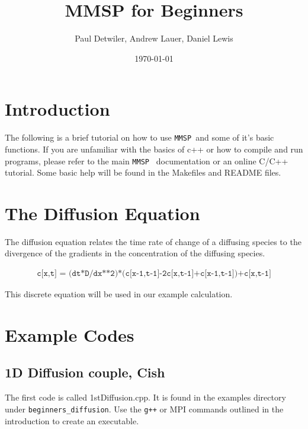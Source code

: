 \documentclass[10pt]{article}
\title{MMSP for Beginners}
\author{Paul Detwiler, Andrew Lauer, Daniel Lewis}
\date{\today}
\def\MMSP{{\tt MMSP\ }}
\begin{document}
\maketitle
\section{Introduction}
The following is a brief tutorial on how to use \MMSP and some of it's
basic functions. If you are unfamiliar with the basics of c++ or how
to compile and run programs, please refer to the main \MMSP
documentation or an online C/C++ tutorial.  Some basic help will be
found in the Makefiles and README files.

\section{The Diffusion Equation}

The diffusion equation relates the time rate of change of a diffusing
species to the divergence of the gradients in the concentration of the
diffusing species.

\begin{eqnarray}
\texttt{c[x,t] = (dt*D/dx**2)*(c[x-1,t-1]-2c[x,t-1]+c[x-1,t-1])+c[x,t-1]}
\end{eqnarray}

This discrete equation will be used in our example calculation.

\section{Example Codes}
\label{sec:examples}

\begin{listings}
\end{listings}

\subsection{1D Diffusion couple, Cish}

The first code is called 1stDiffusion.cpp.  It is found in the
examples directory under {\tt beginners\_diffusion}. Use the {\tt g++}
or MPI commands outlined in the introduction to create an executable.
\end{document}
